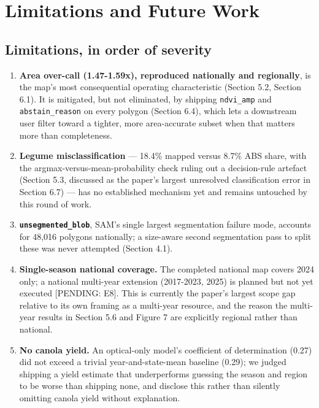 
\section{Limitations and Future Work}\label{limitations-and-future-work}

\subsection{Limitations, in order of severity}\label{limitations-in-order-of-severity}

\begin{enumerate}
\def\labelenumi{\arabic{enumi}.}
\tightlist
\item
  \textbf{Area over-call (1.47-1.59x), reproduced nationally and regionally}, is the map's most consequential operating characteristic (Section 5.2, Section 6.1). It is mitigated, but not eliminated, by shipping \texttt{ndvi\_amp} and \texttt{abstain\_reason} on every polygon (Section 6.4), which lets a downstream user filter toward a tighter, more area-accurate subset when that matters more than completeness.
\item
  \textbf{Legume misclassification} --- 18.4\% mapped versus 8.7\% ABS share, with the argmax-versus-mean-probability check ruling out a decision-rule artefact (Section 5.3, discussed as the paper's largest unresolved classification error in Section 6.7) --- has no established mechanism yet and remains untouched by this round of work.
\item
  \textbf{\texttt{unsegmented\_blob}}, SAM's single largest segmentation failure mode, accounts for 48,016 polygons nationally; a size-aware second segmentation pass to split these was never attempted (Section 4.1).
\item
  \textbf{Single-season national coverage.} The completed national map covers 2024 only; a national multi-year extension (2017-2023, 2025) is planned but not yet executed {[}PENDING: E8{]}. This is currently the paper's largest scope gap relative to its own framing as a multi-year resource, and the reason the multi-year results in Section 5.6 and Figure 7 are explicitly regional rather than national.
\item
  \textbf{No canola yield.} An optical-only model's coefficient of determination (0.27) did not exceed a trivial year-and-state-mean baseline (0.29); we judged shipping a yield estimate that underperforms guessing the season and region to be worse than shipping none, and disclose this rather than silently omitting canola yield without explanation.

\end{enumerate}
